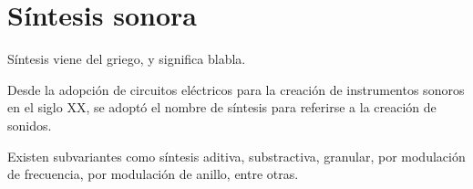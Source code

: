 \documentclass[../candidatura.tex]{subfiles}
\begin{document}
\section{Síntesis sonora}

Síntesis viene del griego, y significa blabla.

Desde la adopción de circuitos eléctricos para la creación de instrumentos sonoros en el siglo XX, se adoptó el nombre de síntesis para referirse a la creación de sonidos.

Existen subvariantes como síntesis aditiva, substractiva, granular, por modulación de frecuencia, por modulación de anillo, entre otras.

\newpage
\end{document}
